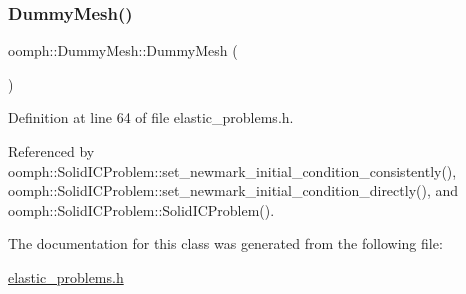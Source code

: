 \subsubsection{\texorpdfstring{Dummy\+Mesh()}{DummyMesh()}}
{\footnotesize\ttfamily oomph\+::\+Dummy\+Mesh\+::\+Dummy\+Mesh (\begin{DoxyParamCaption}{ }\end{DoxyParamCaption})\hspace{0.3cm}{\ttfamily [inline]}}



Definition at line 64 of file elastic\+\_\+problems.\+h.



Referenced by oomph\+::\+Solid\+I\+C\+Problem\+::set\+\_\+newmark\+\_\+initial\+\_\+condition\+\_\+consistently(), oomph\+::\+Solid\+I\+C\+Problem\+::set\+\_\+newmark\+\_\+initial\+\_\+condition\+\_\+directly(), and oomph\+::\+Solid\+I\+C\+Problem\+::\+Solid\+I\+C\+Problem().



The documentation for this class was generated from the following file\+:\begin{DoxyCompactItemize}
\item 
\hyperlink{elastic__problems_8h}{elastic\+\_\+problems.\+h}\end{DoxyCompactItemize}
